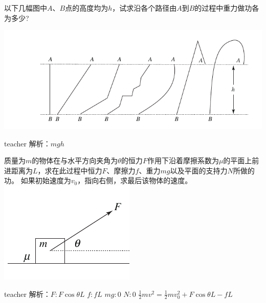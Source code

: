 \begin{example}
以下几幅图中$A$、$B$点的高度均为$h$，试求沿各个路径由$A$到$B$的过程中重力做功各为多少?
\begin{center}
\includegraphics{images/energy-2.pdf}
\end{center}
\begin{taggedblock}{teacher}
\noindent
解析：$mgh$
\end{taggedblock}
\end{example}


\begin{example}
质量为$m$的物体在与水平方向夹角为$\theta$的恒力$F$作用下沿着摩擦系数为$\mu$的平面上前进距离为$L$，求在此过程中恒力$F$、摩擦力$f$、重力$mg$以及平面的支持力$N$所做的功。
如果初始速度为$v_0$，指向右侧，求最后该物体的速度。
\includegraphics{images/energy-3.pdf}
\begin{taggedblock}{teacher}
\noindent
解析：$F:F\cos\theta L$   $f:fL$     $mg: 0$   $N:0$
\newline
$\frac{1}{2}mv^2=\frac{1}{2}mv_0^2+F\cos\theta L-fL$

\end{taggedblock}
\end{example}

